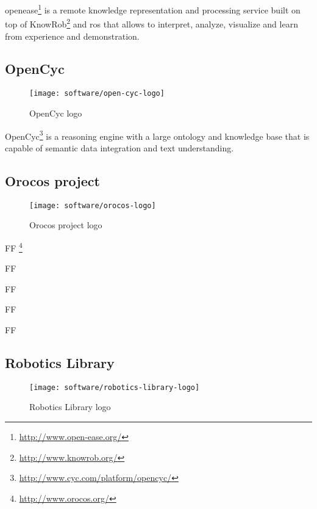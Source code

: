 \gls{openease}\footnote{\url{http://www.open-ease.org/}} \cite{Beetz2015} is a remote knowledge representation and processing service built on top of KnowRob\footnote{\url{http://www.knowrob.org/}} and \gls{ros} that allows to interpret, analyze, visualize and learn from experience and demonstration.


\subsection{OpenCyc}

\begin{wrapfigure}{r}{0.23\textwidth}
	\centering
	\vspace*{-2em}
	\texttt{[image: software/open-cyc-logo]}
	\caption{OpenCyc logo}
	\label{fig:open-cyc}
\end{wrapfigure}

OpenCyc\footnote{\url{http://www.cyc.com/platform/opencyc/}} is a reasoning engine with a large ontology and knowledge base that is capable of semantic data integration and text understanding.


\subsection{Orocos project}

\begin{wrapfigure}{r}{0.23\textwidth}
	\centering
	\vspace*{-2em}
	\texttt{[image: software/orocos-logo]}
	\caption{Orocos project logo}
	\label{fig:orocos-logo}
\end{wrapfigure}

FF \footnote{\url{http://www.orocos.org/}}

FF

FF

FF

FF


\subsection{Robotics Library}

\begin{wrapfigure}{r}{0.23\textwidth}
	\centering
	\vspace*{-2em}
	\texttt{[image: software/robotics-library-logo]}
	\caption{Robotics Library logo}
	\label{fig:robotics-library-logo}
\end{wrapfigure}

